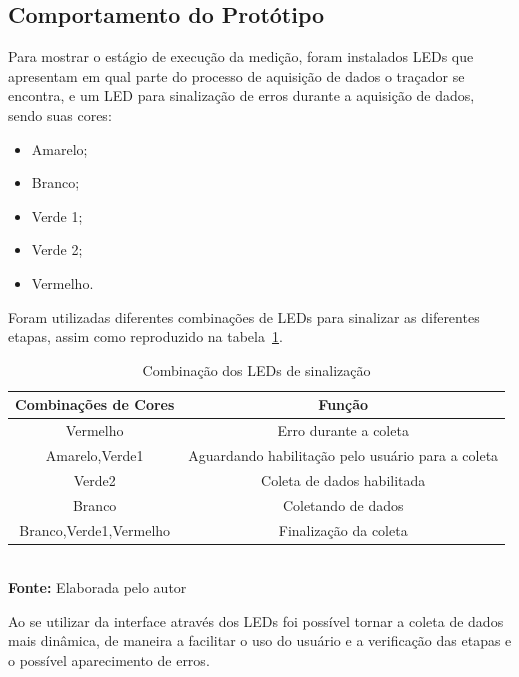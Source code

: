 \subsection{Comportamento do Protótipo}

Para mostrar o estágio de execução da medição, foram instalados LEDs que apresentam em qual parte do processo de aquisição de dados o traçador se encontra, e um LED para sinalização de erros durante a aquisição de dados, sendo suas cores:

\begin{itemize}
	\item Amarelo;
	\item Branco;
	\item Verde 1;
	\item Verde 2;
	\item Vermelho.
\end{itemize}

Foram utilizadas diferentes combinações de LEDs para sinalizar as diferentes etapas, assim como  reproduzido na tabela~\ref{tab:LEDS}.

\FloatBarrier
\begin{table}[!htbp]
	\centering
	\caption{Combinação dos LEDs de sinalização}
	\begin{tabular}{ c | c }
		\hline
		\textbf{Combinações de Cores} & \textbf{Função}                                   \\ \hline
		Vermelho                      & Erro durante a coleta                             \\ \hline
		Amarelo,Verde1                & Aguardando habilitação pelo usuário para a coleta \\ \hline
		Verde2                        & Coleta de dados habilitada                        \\ \hline
		Branco                        & Coletando de dados                                \\ \hline
		Branco,Verde1,Vermelho        & Finalização da coleta                             \\ \hline
	\end{tabular}
	\\ \vspace{0.2cm}
	\textbf{Fonte:} Elaborada pelo autor
	\label{tab:LEDS}
\end{table}
\FloatBarrier

Ao se utilizar da interface através dos LEDs foi possível tornar a coleta de dados mais dinâmica, de maneira a facilitar o uso do usuário e a verificação das etapas e o possível aparecimento de erros.

